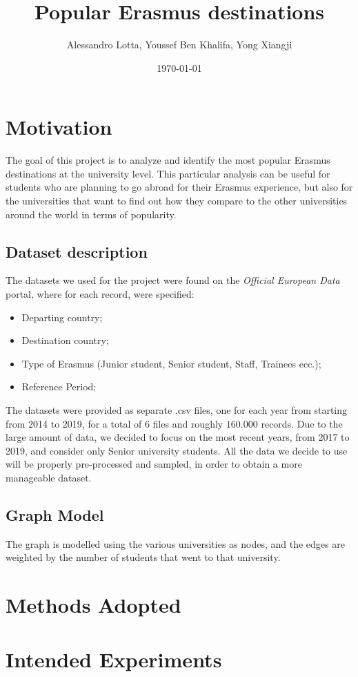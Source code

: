 
\title{Popular Erasmus destinations}
\author{Alessandro Lotta, Youssef Ben Khalifa, Yong Xiangji}
\date{\today}

\maketitle \tableofcontents 
\listofalgorithms
\newpage
\section{Motivation}
    The goal of this project is to analyze and identify the most popular Erasmus destinations at the university level. This particular analysis
    can be useful for students who are planning to go abroad for their Erasmus experience, but also for the universities that want to find out 
    how they compare to the other universities around the world in terms of popularity. 
\subsection{Dataset description}
    The datasets we used for the project were found on the \textit{Official European Data} portal, where for each record, were specified:
    \begin{itemize}
        \item Departing country;
        \item Destination country;
        \item Type of Erasmus (Junior student, Senior student, Staff, Trainees ecc.);
        \item Reference Period;
    \end{itemize}
    The datasets were provided as separate .csv files, one for each year from starting from 2014 to 2019, for a total of 6 files and roughly $160.000$ records.
    Due to the large amount of data, we decided to focus on the most recent years, from 2017 to 2019, and consider only Senior university students. All the data we decide 
    to use will be properly pre-processed and sampled, in order to obtain a more manageable dataset. 
\subsection{Graph Model}
    The graph is modelled using the various universities as nodes, and the edges are weighted by the number of students that went to that university.

\section{Methods Adopted}

\section{Intended Experiments}

